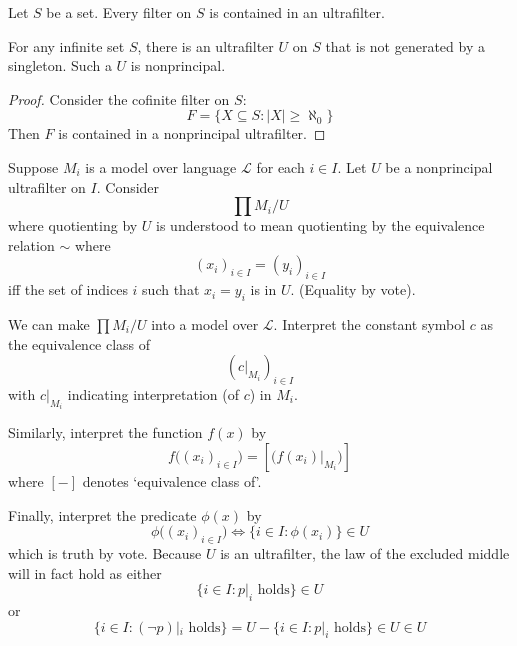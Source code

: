 \documentclass{scrartcl}
\begin{document}
\begin{lemma}\label{lem:ultra}
  Let $S$ be a set. Every filter on $S$ is contained in an ultrafilter. 
\end{lemma}
\begin{cor}
  For any infinite set $S$, there is an ultrafilter $U$ on $S$ that is not generated by a singleton. Such a $U$ is nonprincipal. 
\end{cor}
\begin{proof}
  Consider the cofinite filter on $S$:
  \[
  F=\{X\subseteq S: |X|\geq \aleph_0\}
  \]
  Then $F$ is contained in a nonprincipal ultrafilter. 
\end{proof}
\begin{defn}[ultrapower]
  Suppose $M_i$ is a model over language $\mathcal L$ for each $i\in I$. Let $U$ be a nonprincipal ultrafilter on $I$. Consider
  \[
  \prod M_i / U
  \]
  where quotienting by $U$ is understood to mean quotienting by the equivalence relation $\sim$ where
  \[
  (x_i)_{i\in I} = (y_i)_{i\in I}
  \]
  iff the set of indices $i$ such that $x_i = y_i$ is in $U$. (Equality by vote).
  
  We can make $\prod M_i / U$ into a model over $\mathcal L$. Interpret the constant symbol $c$ as the equivalence class of
  \[
  (c|_{M_i})_{i\in I}
  \]
  with $c|_{M_i}$ indicating interpretation (of $c$) in $M_i$. 
  
  Similarly, interpret the function $f(x)$ by
  \[
  f\bigl( (x_i)_{i\in I} \bigr) = \left[\bigl( f(x_i)|_{M_i}\bigr)\right]
  \]
  where $[-]$ denotes `equivalence class of'. 
  
  Finally, interpret the predicate $\phi(x)$ by 
  \[
  \phi\bigl((x_i)_{i\in I}\bigr) \iff \{i\in I: \phi(x_i)\} \in U
  \]
  which is truth by vote. Because $U$ is an ultrafilter, the law of the excluded middle will in fact hold as either 
  \[
  \{i\in I: p|_i\textrm{ holds}\} \in U
  \]
  or 
  \[
  \{i\in I: (\neg p)|_i\textrm{ holds}\} = U-   \{i\in I: p|_i\textrm{ holds}\} \in U\in U
  \]
\end{defn}
\end{document}
